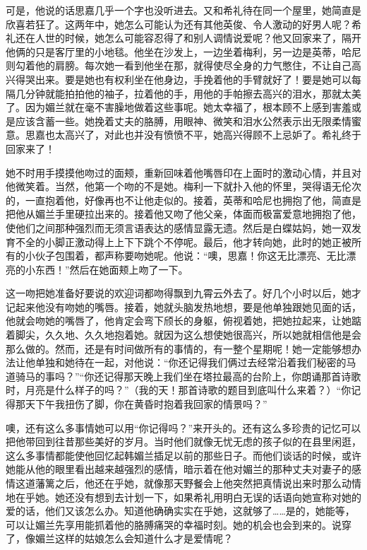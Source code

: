 \par 可是，他说的话思嘉几乎一个字也没听进去。又和希礼待在同一个屋里，她简直是欣喜若狂了。这两年中，她怎么可能认为还有其他英俊、令人激动的好男人呢？希礼还在人世的时候，她怎么可能容忍得了和别人调情说爱呢？他又回家来了，隔开他俩的只是客厅里的小地毯。他坐在沙发上，一边坐着梅利，另一边是英蒂，哈尼则勾着他的肩膀。每次她一看到他坐在那，就得使尽全身的力气憋住，不让自己高兴得哭出来。要是她也有权利坐在他身边，手挽着他的手臂就好了！要是她可以每隔几分钟就能拍拍他的袖子，拉着他的手，用他的手帕擦去高兴的泪水，那就太美了。因为媚兰就在毫不害臊地做着这些事呢。她太幸福了，根本顾不上感到害羞或是应该含蓄一些。她挽着丈夫的胳膊，用眼神、微笑和泪水公然表示出无限柔情蜜意。思嘉也太高兴了，对此也并没有愤愤不平，她高兴得顾不上忌妒了。希礼终于回家来了！
\par 她不时用手摸摸他吻过的面颊，重新回味着他嘴唇印在上面时的激动心情，并且对他微笑着。当然，他第一个吻的不是她。梅利一下就扑入他的怀里，哭得语无伦次的，一直抱着他，好像再也不让他走似的。接着，英蒂和哈尼也拥抱了他，简直是把他从媚兰手里硬拉出来的。接着他又吻了他父亲，体面而极富爱意地拥抱了他，使他们之间那种强烈而无须言语表达的感情显露无遗。然后是白蝶姑妈，她一双发育不全的小脚正激动得上上下下跳个不停呢。最后，他才转向她，此时的她正被所有的小伙子包围着，都声称要吻她呢。他说：“噢，思嘉！你这无比漂亮、无比漂亮的小东西！”然后在她面颊上吻了一下。
\par 这一吻把她准备好要说的欢迎词都吻得飘到九霄云外去了。好几个小时以后，她才记起来他没有吻她的嘴唇。接着，她就头脑发热地想，要是他单独跟她见面的话，他就会吻她的嘴唇了，他肯定会弯下颀长的身躯，俯视着她，把她拉起来，让她踮着脚尖，久久地、久久地抱着她。就因为这么想使她很高兴，所以她就相信他是会那么做的。然而，还是有时间做所有的事情的，有一整个星期呢！她一定能够想办法让他单独和她待在一起，对他说：“你还记得我们俩过去经常沿着我们秘密的马道骑马的事吗？”“你还记得那天晚上我们坐在塔拉最高的台阶上，你朗诵那首诗歌时，月亮是什么样子的吗？”（我的天！那首诗歌的题目到底叫什么来着？）“你记得那天下午我扭伤了脚，你在黄昏时抱着我回家的情景吗？”
\par 噢，还有这么多事情她可以用“你记得吗？”来开头的。还有这么多珍贵的记忆可以把他带回到往昔那些美好的岁月。当时他们就像无忧无虑的孩子似的在县里闲逛，这么多事情都能使他回忆起韩媚兰插足以前的那些日子。而他们谈话的时候，或许她能从他的眼里看出越来越强烈的感情，暗示着在他对媚兰的那种丈夫对妻子的感情这道藩篱之后，他还在乎她，就像那天野餐会上他突然把真情说出来时那么动情地在乎她。她还没有想到去计划一下，如果希礼用明白无误的话语向她宣称对她的爱的话，他们又该怎么办。知道他确确实实在乎她，这就够了……是的，她能等，可以让媚兰先享用能抓着他的胳膊痛哭的幸福时刻。她的机会也会到来的。说穿了，像媚兰这样的姑娘怎么会知道什么才是爱情呢？

